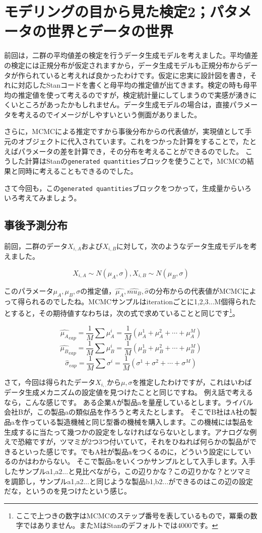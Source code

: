 \documentclass{ltjsbook}
\begin{document}
 
\chapter{モデリングの目から見た検定2；パタメータの世界とデータの世界}
\label{chapter20} 
前回は，二群の平均値差の検定を行うデータ生成モデルを考えました。平均値差の検定には正規分布が仮定されますから，データ生成モデルも正規分布からデータが作られていると考えれば良かったわけです。仮定に忠実に設計図を書き，それに対応したStanコードを書くと母平均の推定値が出てきます。検定の時も母平均の推定値を使って考えるのですが，検定統計量にしてしまうので実感が湧きにくいところがあったかもしれません。データ生成モデルの場合は，直接パラメータを考えるのでイメージがしやすいという側面がありました。

さらに，MCMCによる推定ですから事後分布からの代表値が，実現値として手元のオブジェクトに代入されています。これをつかった計算をすることで，たとえばパラメータの差を計算でき，その分布を考えることができるのでした。
こうした計算はStanの\texttt{generated quantities}ブロックを使うことで，MCMCの結果と同時に考えることもできるのでした。

さて今回も，この\texttt{generated quantities}ブロックをつかって，生成量からいろいろ考えてみましょう。
\section{事後予測分布}
前回，二群のデータ$X_{i,A}$および$X_{i,B}$に対して，次のようなデータ生成モデルを考えました。

$$ X_{i,A} \sim N(\mu_A,\sigma), X_{i,B} \sim N(\mu_B,\sigma) $$

このパラメータ$\mu_A,\mu_B,\sigma$の推定値，$\hat{\mu_A},\hat{mu_B},\hat{\sigma}$の分布からの代表値がMCMCによって得られるのでしたね。MCMCサンプルはiterationごとに1,2,3...M個得られたとすると，その期待値すなわちは，次の式で求めていることと同じです\footnote{ここで上つきの数字はMCMCのステップ番号を表しているもので，冪乗の数字ではありません。またMはStanのデフォルトでは4000です。}。

$$ \hat{\mu_A}_{eap} = \frac{1}{M}\sum \mu_A^i = \frac{1}{M}(\mu_A^1+\mu_A^2+\cdots+\mu_A^M) $$
$$ \hat{\mu_B}_{eap} = \frac{1}{M}\sum \mu_B^i = \frac{1}{M}(\mu_B^1+\mu_B^2+\cdots+\mu_B^M) $$
$$ \hat{\sigma}_{eap} = \frac{1}{M}\sum \sigma^i = \frac{1}{M}(\sigma^1+\sigma^2+\cdots+\sigma^M) $$

さて，今回は得られたデータ$X_{i,.}$から$\mu,\sigma$を推定したわけですが，これはいわばデータ生成メカニズムの設定値を見つけたことと同じですね。
例え話で考えるなら，こんな感じです。
ある企業Aが製品aを量産しているとします。ライバル会社Bが，この製品aの類似品を作ろうと考えたとします。
そこでB社はA社の製品aを作っている製造機械と同じ型番の機械を購入します。この機械には製品を生成するに当たって幾つかの設定をしなければならないとします。アナログな例えで恐縮ですが，ツマミが2つ3つ付いていて，それをひねれば何らかの製品ができるといった感じです。でもA社が製品aをつくるのに，どういう設定にしているのかはわからない。
そこで製品aをいくつかサンプルとして入手します。入手したサンプルa1,a2...と見比べながら，この辺りかな？この辺りかな？とツマミを調節し，サンプルa1,a2...と同じような製品b1,b2...ができるのはこの辺の設定だな，というのを見つけたという感じ。
\end{document}
